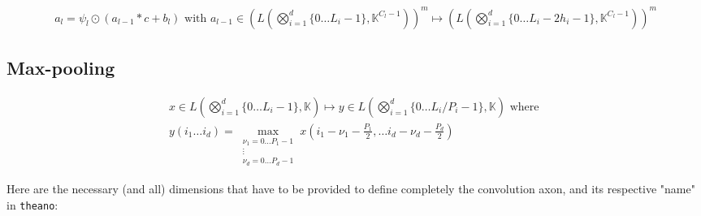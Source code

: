 \documentclass[10pt]{amsart}
\begin{document}
\begin{multicols*}{2}

\begin{equation}
\begin{gathered}
a_l  = \psi_l \odot ( a_{l-1} * c + b_l ) \text{ with } 
	a_{l-1} \in ( L \left( \bigotimes_{i=1}^d \lbrace 0\dots L_i -1 \rbrace, \mathbb{K}^{C_l-1}  \right) )^m \mapsto ( L \left( \bigotimes_{i=1}^d \lbrace 0\dots L_i -2h_i-1 \rbrace, \mathbb{K}^{C_l-1}  \right) )^m
\end{gathered}
\end{equation}

\subsection{Max-pooling}  

\begin{equation}
\begin{gathered}
	x \in L(\bigotimes_{i=1}^d \lbrace 0 \dots L_i - 1\rbrace ,\mathbb{K} ) \mapsto y \in L(\bigotimes_{i=1}^d \lbrace 0 \dots L_i /P_i - 1\rbrace ,\mathbb{K} )   \text{ where } \\
y(i_1\dots i_d) = \max_{ \substack{ \nu_1 = 0 \dots P_1 - 1 \\ \vdots \\ \nu_d = 0 \dots P_d-1 } } x(i_1 - \nu_1 - \frac{P_1}{2} , \dots i_d - \nu_d - \frac{P_d}{2} )
\end{gathered}
\end{equation}

Here are the necessary (and all) dimensions that have to be provided to define completely the convolution axon, and its respective "name" in \verb|theano|:  


\end{multicols*}
\end{document}
